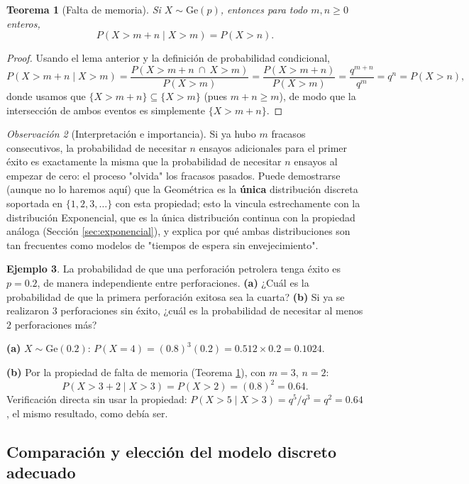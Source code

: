 \documentclass[11pt,a4paper]{article}
\theoremstyle{plain}
\newtheorem{teorema}{Teorema}[section]
\theoremstyle{definition}
\newtheorem{ejemplo}[teorema]{Ejemplo}
\theoremstyle{remark}
\newtheorem{observacion}[teorema]{Observación}
\begin{document}
\begin{teorema}[Falta de memoria]\label{thm:falta_memoria_geom}
Si $X\sim\text{Ge}(p)$, entonces para todo $m,n\ge0$ enteros,
$$P(X>m+n\mid X>m)=P(X>n).$$
\end{teorema}
\begin{proof}
Usando el lema anterior y la definición de probabilidad condicional,
$$P(X>m+n\mid X>m)=\frac{P(X>m+n\ \cap\ X>m)}{P(X>m)}=\frac{P(X>m+n)}{P(X>m)}=\frac{q^{m+n}}{q^m}=q^n=P(X>n),$$
donde usamos que $\{X>m+n\}\subseteq\{X>m\}$ (pues $m+n\ge m$), de modo que la intersección de ambos eventos es simplemente $\{X>m+n\}$.
\end{proof}

\begin{observacion}[Interpretación e importancia]
Si ya hubo $m$ fracasos consecutivos, la probabilidad de necesitar $n$ ensayos adicionales para el primer éxito es exactamente la misma que la probabilidad de necesitar $n$ ensayos al empezar de cero: el proceso "olvida" los fracasos pasados. Puede demostrarse (aunque no lo haremos aquí) que la Geométrica es la \textbf{única} distribución discreta soportada en $\{1,2,3,\dots\}$ con esta propiedad; esto la vincula estrechamente con la distribución Exponencial, que es la única distribución continua con la propiedad análoga (Sección \ref{sec:exponencial}), y explica por qué ambas distribuciones son tan frecuentes como modelos de "tiempos de espera sin envejecimiento".
\end{observacion}

\begin{ejemplo}
La probabilidad de que una perforación petrolera tenga éxito es $p=0.2$, de manera independiente entre perforaciones.
\textbf{(a)} ¿Cuál es la probabilidad de que la primera perforación exitosa sea la cuarta?
\textbf{(b)} Si ya se realizaron $3$ perforaciones sin éxito, ¿cuál es la probabilidad de necesitar al menos $2$ perforaciones más?

\textbf{(a)} $X\sim\text{Ge}(0.2)$: $P(X=4)=(0.8)^3(0.2)=0.512\times0.2=0.1024$.

\textbf{(b)} Por la propiedad de falta de memoria (Teorema \ref{thm:falta_memoria_geom}), con $m=3$, $n=2$:
$$P(X>3+2\mid X>3)=P(X>2)=(0.8)^2=0.64.$$
Verificación directa sin usar la propiedad: $P(X>5\mid X>3)=q^5/q^3=q^2=0.64$, el mismo resultado, como debía ser.
\end{ejemplo}

\subsection{Comparación y elección del modelo discreto adecuado}
\end{document}
